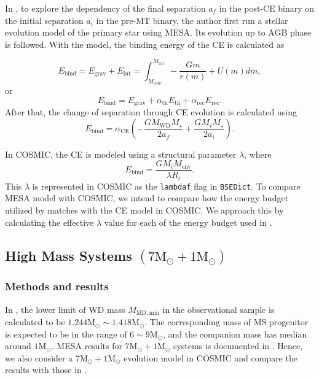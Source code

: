 \documentclass[12pt]{article}
\newcommand{\Msun}{\mathrm{M_{\odot}}}
\newcommand{\MWD}{M_{\mathrm{WD}}}
\newcommand{\Mstar}{M_{\star}}
\newcommand{\alphace}{\alpha_{\mathrm{CE}}}
\newcommand{\alphath}{\alpha_{\mathrm{th}}}
\newcommand{\alpharec}{\alpha_{\mathrm{rec}}}
\newcommand{\Ebind}{E_{\mathrm{bind}}}
\begin{document}
In \cite{yamaguchi_hi, yamaguchi_lo}, to explore the dependency of the final separation $a_f$ in the post-CE binary on the initial separation $a_i$ in the pre-MT binary, the author first run a stellar evolution model of the primary star using MESA. Its evolution up to AGB phase is followed. With the model, the binding energy of the CE is calculated as

\begin{equation}
  E_{\mathrm{bind}} = E_{\mathrm{grav}} + E_{\mathrm{int}} = \int_{M_{\mathrm{core}}}^{M_{\mathrm{tot}}} -\frac{Gm}{r(m)} + U(m) dm,
  \label{budget-int}
\end{equation}
or
\begin{equation}
  E_{\mathrm{bind}} = E_{\mathrm{grav}} + \alphath E_{\mathrm{th}} + \alpharec E_{\mathrm{rec}}.
  \label{budget-th-rec}
\end{equation}
After that, the change of separation through CE evolution is calculated using
\begin{equation}
  E_{\mathrm{bind}} = \alphace \left(-\frac{G\MWD \Mstar}{2a_f}+\frac{GM_i \Mstar}{2a_i}\right).
  \label{ebind-sep}
\end{equation}

In COSMIC, the CE is modeled using a structural parameter $\lambda$, where
\begin{equation}
  \Ebind = \frac{G M_i M_{\mathrm{env}}}{\lambda R_i}.   
  \label{ebind}
\end{equation}
This $\lambda$ is represented in COSMIC as the \verb|lambdaf| flag in \verb|BSEDict|. To compare MESA model with COSMIC, we intend to compare how the energy budget utilized by \cite{yamaguchi_hi, yamaguchi_lo} matches with the CE model in COSMIC. We approach this by calculating the effective $\lambda$ value for each of the energy budget used in \cite{yamaguchi_hi, yamaguchi_lo}. 

\subsection{High Mass Systems $(7 \Msun + 1 \Msun)$} \label{subsec:high}

\subsubsection{Methods and results}

In \cite{yamaguchi_hi}, the lower limit of WD mass $M_{\mathrm{MD, min}}$ in the observational sample is calculated to be $1.244\Msun \sim 1.418\Msun$. The corresponding mass of MS progenitor is expected to be in the range of $6 \sim 9 \Msun$, and the companion mass has median around $1\Msun$. MESA results for $7\Msun + 1\Msun$ systems is documented in \cite{yamaguchi_hi}. Hence, we also consider a $7\Msun + 1\Msun$ evolution model in COSMIC and compare the results with those in \cite{yamaguchi_hi}.
\end{document}
